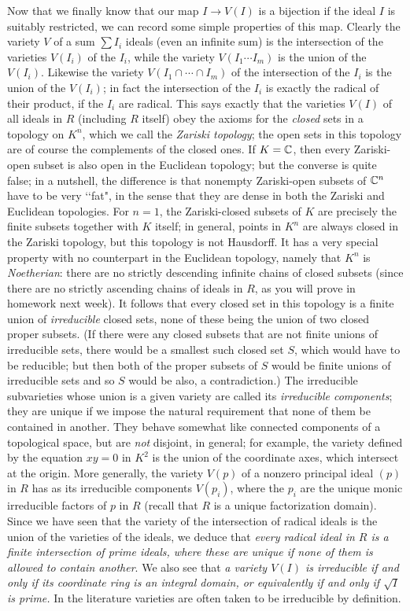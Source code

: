 \documentclass[10pt]{article}
\begin{document}
Now that we finally know that our map $I\rightarrow V(I)$ is a bijection
if the ideal $I$ is suitably restricted, we can record some simple
properties of this map. Clearly the variety $V$ of a sum $\sum I_i$
ideals (even an infinite sum) is the intersection of the varieties
$V(I_i)$ of the $I_i$, while the variety $V(I_1\cdots I_m)$ is the union
of the $V(I_i)$. Likewise the variety $V(I_1\cap\cdots\cap I_m)$ of the
intersection of the $I_i$ is the union of the $V(I_i)$; in fact the
intersection of the $I_i$ is exactly the radical of their product, if
the $I_i$ are radical. This says exactly that the varieties $V(I)$ of
all ideals in $R$ (including $R$ itself) obey the axioms for the {\sl
  closed} sets in a topology on $K^n$, which we call the {\sl Zariski
  topology}; the open sets in this topology are of course the
complements of the closed ones. If $K=\Bbb C$, then every Zariski-open
subset is also open in the Euclidean topology; but the converse is quite
false; in a nutshell, the difference is that nonempty Zariski-open
subsets of $\Bbb C^n$ have to be very \lq\lq fat", in the sense that
they are dense in both the Zariski and Euclidean topologies. For $n=1$,
the Zariski-closed subsets of $K$ are precisely the finite subsets
together with $K$ itself; in general, points in $K^n$ are always closed
in the Zariski topology, but this topology is not Hausdorff. It has a
very special property with no counterpart in the Euclidean topology,
namely that $K^n$ is {\sl Noetherian}: there are no strictly descending
infinite chains of closed subsets (since there are no strictly ascending
chains of ideals in $R$, as you will prove in homework next week). It
follows that every closed set in this topology is a finite union of {\sl
  irreducible} closed sets, none of these being the union of two closed
proper subsets. (If there were any closed subsets that are not finite
unions of irreducible sets, there would be a smallest such closed set
$S$, which would have to be reducible; but then both of the proper
subsets of $S$ would be finite unions of irreducible sets and so $S$
would be also, a contradiction.) The irreducible subvarieties whose
union is a given variety are called its {\sl irreducible components};
they are unique if we impose the natural requirement that none of them
be contained in another. They behave somewhat like connected components
of a topological space, but are {\sl not} disjoint, in general; for
example, the variety defined by the equation $xy = 0$ in $K^2$ is the
union of the coordinate axes, which intersect at the origin. More
generally, the variety $V(p)$ of a nonzero principal ideal $(p)$ in $R$
has as its irreducible components $V(p_i)$, where the $p_i$ are the
unique monic irreducible factors of $p$ in $R$ (recall that $R$ is a
unique factorization domain). Since we have seen that the variety of the
intersection of radical ideals is the union of the varieties of the
ideals, we deduce that {\sl every radical ideal in $R$ is a finite
  intersection of prime ideals, where these are unique if none of them
  is allowed to contain another}. We also see that {\sl a variety $V(I)$
  is irreducible if and only if its coordinate ring is an integral
  domain, or equivalently if and only if $\sqrt{I}$ is prime.} In the
literature varieties are often taken to be irreducible by definition.
\end{document}
